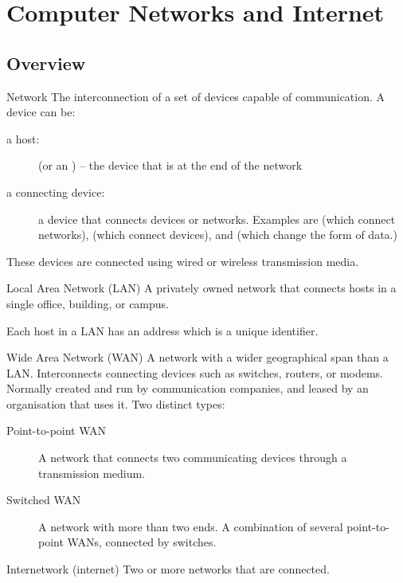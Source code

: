 \documentclass[\main/notes.tex]{subfiles}
\begin{document}
	\ifSubfilesClassLoaded{\setcounter{chapter}{5}}{}
	\chapter{Computer Networks and Internet}
		\section{Overview}
			\begin{definition}{Network}
				The interconnection of a set of devices capable of communication. A device can be:
				\begin{indentparagraph}
					\begin{description}
						\item[a host:] (or an ) -- the device that is at the end of the network
						\item[a connecting device:] a device that connects devices or networks.
							Examples are  (which connect networks),  (which connect devices), and  (which change the form of data.)
					\end{description}
				\end{indentparagraph}
				These devices are connected using wired or wireless transmission media.
			\end{definition}
			\begin{definition}{Local Area Network (LAN)}
				A privately owned network that connects hosts in a single office, building, or campus.

				Each host in a LAN has an address which is a unique identifier.
			\end{definition}
			\begin{definition}{Wide Area Network (WAN)}
				A network with a wider geographical span than a LAN. Interconnects connecting devices such as switches, routers, or modems. Normally created and run by communication companies, and leased by an organisation that uses it. Two distinct types:
				\begin{indentparagraph}
					\begin{description}
						\item[Point-to-point WAN] A network that connects two communicating devices through a transmission medium.
						\item[Switched WAN] A network with more than two ends. A combination of several point-to-point WANs, connected by switches.  
					\end{description}
				\end{indentparagraph}
			\end{definition}
			\begin{definition}{Internetwork (internet)}
				Two or more networks that are connected.
			\end{definition}
\end{document}
